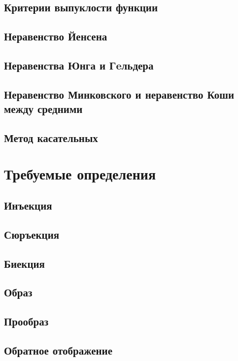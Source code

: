 \subsection{Критерии выпуклости функции}

\skip
\subsection{Неравенство Йенсена}

\skip
\subsection{Неравенства Юнга и Гeльдера}

\skip
\subsection{Неравенство Минковского и неравенство Коши между средними}

\skip
\subsection{Метод касательных}

\skip
\newpage
\section{Требуемые определения}
\subsection{Инъекция}

\skip
\subsection{Сюръекция}

\skip
\subsection{Биекция}

\skip
\subsection{Образ}

\skip
\subsection{Прообраз}

\skip
\subsection{Обратное отображение}

\skip
